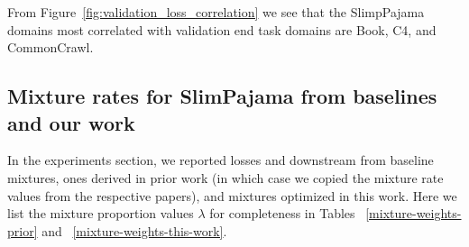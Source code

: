 From Figure~\ref{fig:validation_loss_correlation} we see that the SlimpPajama domains most correlated with validation end task domains are Book, C4, and CommonCrawl.

\subsection{Mixture rates for SlimPajama from baselines and our work}

In the experiments section, we reported losses and downstream from baseline mixtures, ones derived in prior work (in which case we copied the mixture rate values from the respective papers), and mixtures optimized in this work. Here we list the mixture proportion values $\lambda$ for completeness in Tables ~\ref{mixture-weights-prior} and ~\ref{mixture-weights-this-work}.

\begin{table}[htbp]
\begin{center}
\begin{small}
\begin{sc}
\end{sc}
\end{small}
\end{center}
\caption{SlimPajama data mixture rates derived through different approaches from prior work. DoGE and DoReMI weights are from the SlimPajama experiments of ~\cite{DOGE}. DML weights are copied from ~\cite{dml}.} %
\label{mixture-weights-prior}
\end{table}



